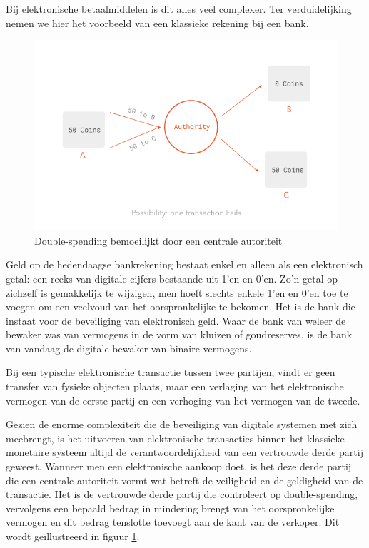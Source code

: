 			Bij elektronische betaalmiddelen is dit alles veel complexer. Ter verduidelijking nemen we hier het voorbeeld van een klassieke rekening bij een bank.
			
			\begin{figure}
				\includegraphics[width=\linewidth]{img/double_spending2.png}
				\caption{Double-spending bemoeilijkt door een centrale autoriteit}
				\label{fig:double_spending2}
			\end{figure}
			
			 Geld op de hedendaagse bankrekening bestaat enkel en alleen als een elektronisch getal: een reeks van digitale cijfers bestaande uit 1’en en 0’en. Zo’n getal op zichzelf is gemakkelijk te wijzigen, men hoeft slechts enkele 1’en en 0’en toe te voegen om een veelvoud van het oorspronkelijke te bekomen. Het is de bank die instaat voor de beveiliging van elektronisch geld. Waar de bank van weleer de bewaker was van vermogens in de vorm van kluizen of goudreserves, is de bank van vandaag de digitale bewaker van binaire vermogens.
			
			Bij een typische elektronische transactie tussen twee partijen, vindt er geen transfer van fysieke objecten plaats, maar een verlaging van het elektronische vermogen van de eerste partij en een verhoging van het vermogen van de tweede. 
		
			Gezien de enorme complexiteit die de beveiliging van digitale systemen met zich meebrengt, is het uitvoeren van elektronische transacties binnen het klassieke monetaire systeem altijd de verantwoordelijkheid van een vertrouwde derde partij geweest. Wanneer men een elektronische aankoop doet, is het deze derde partij die een centrale autoriteit vormt wat betreft de veiligheid en de geldigheid van de transactie. Het is de vertrouwde derde partij die controleert op double-spending, vervolgens een bepaald bedrag in mindering brengt van het oorspronkelijke vermogen en dit bedrag tenslotte toevoegt aan de kant van de verkoper. Dit wordt geïllustreerd in figuur \ref{fig:double_spending2}.
			
